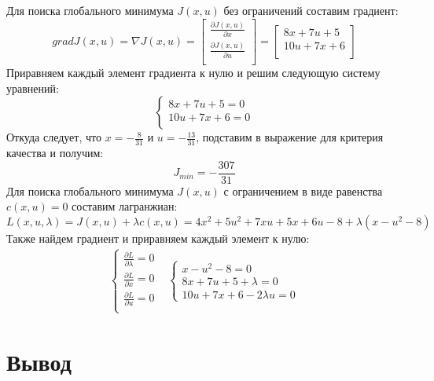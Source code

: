 \documentclass[14pt, a4paper]{extarticle}
\begin{document}
	Для поиска глобального минимума $J(x,u)$ без ограничений составим градиент:
	$$gradJ(x,u)=\nabla J(x,u)=\left[\begin{matrix}
		\frac{\partial J(x,u)}{\partial x} \\
		\frac{\partial J(x,u)}{\partial u} \\
	\end{matrix}\right]=\left[\begin{matrix}
		8x+7u+5 \\
		10u+7x+6 \\
	\end{matrix}\right]$$
	Приравняем каждый элемент градиента к нулю и решим следующую систему уравнений:
	$$\begin{cases}
		8x+7u+5=0 \\
		10u+7x+6=0 \\
	\end{cases}$$
	Откуда следует, что $x=-\frac{8}{31}$ и $u=-\frac{13}{31}$, подставим в выражение для критерия качества и получим:
	$$J_{min}=-\frac{307}{31}$$
	Для поиска глобального минимума $J(x,u)$ с ограничением в виде равенства $c(x,u)=0$ составим лагранжиан:
	$$L(x,u,\lambda)=J(x,u) + \lambda c(x,u) = 4x^2+5u^2+7xu+5x+6u-8 + \lambda (x-u^2-8)$$
	Также найдем градиент и приравняем каждый элемент к нулю:
	$$\begin{matrix}
		\begin{cases}
			\frac{\partial L}{\partial \lambda}=0 \\
			\frac{\partial L}{\partial x}=0 \\
			\frac{\partial L}{\partial u}=0 \\
		\end{cases} &
		\begin{cases}
			x-u^2-8 = 0 \\
			8x+7u+5+\lambda = 0 \\
			10u+7x+6-2\lambda u = 0
		\end{cases}
	\end{matrix}$$
	
	
	\newpage
	
	\section*{Вывод}
	

	
\end{document}
